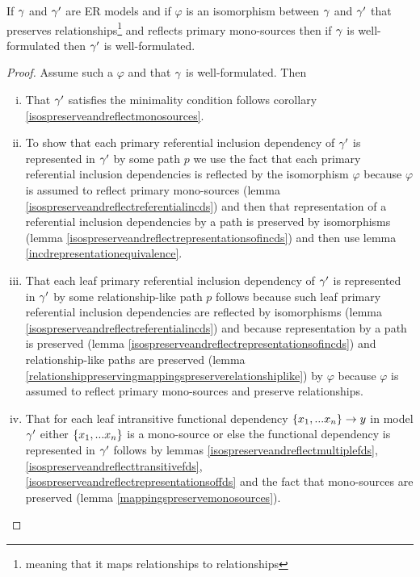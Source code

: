 \begin{lemma}
If $\gamma$ and $\gamma'$ are ER models and  if  $\varphi$ is an isomorphism between $\gamma$  and $\gamma'$ that preserves relationships\footnote{meaning that it maps relationships to relationships} and reflects primary mono-sources then if $\gamma$ is well-formulated then $\gamma'$ is well-formulated.
\end{lemma}
\begin{proof}
Assume such a $\varphi$ and that $\gamma$ is well-formulated. Then
\begin{enumerate} [(i)]
\item{
That $\gamma'$ satisfies the minimality condition follows corollary \ref{isospreserveandreflectmonosources}.
}
\item{ 
To show that each primary referential inclusion dependency of $\gamma'$ is represented in $\gamma'$ by some path $p$ we use the fact that each primary referential inclusion dependencies is reflected
by the isomorphism $\varphi$ because $\varphi$ is assumed to reflect primary mono-sources (lemma \ref{isospreserveandreflectreferentialincds}) and then that representation of a referential inclusion dependencies by a path is  preserved by isomorphisms (lemma \ref{isospreserveandreflectrepresentationsofincds})
and then use lemma \ref{incdrepresentationequivalence}.
}
\item{ 
That each leaf primary referential inclusion dependency of $\gamma'$ is represented in $\gamma'$ by some relationship-like path $p$
follows because such leaf primary referential inclusion dependencies are reflected by isomorphisms
(lemma \ref{isospreserveandreflectreferentialincds})
 and because  representation by a path is preserved (lemma \ref{isospreserveandreflectrepresentationsofincds}) and relationship-like paths are preserved
(lemma \ref{relationshippreservingmappingspreserverelationshiplike}) 
by $\varphi$  because $\varphi$ is assumed to reflect primary mono-sources and preserve relationships.

}
\item{
That for each leaf intransitive functional dependency $\left\{x_1,...x_n\right\} \rightarrow y$ in model $\gamma'$
either $\left\{x_1,...x_n\right\}$ is a mono-source 
or else the functional dependency is represented in $\gamma'$ 
follows by lemmas \ref{isospreserveandreflectmultiplefds}, \ref{isospreserveandreflecttransitivefds},
\ref{isospreserveandreflectrepresentationsoffds} and the fact that mono-sources are preserved (lemma \ref{mappingspreservemonosources}).
}
\end{enumerate}
\end{proof}
